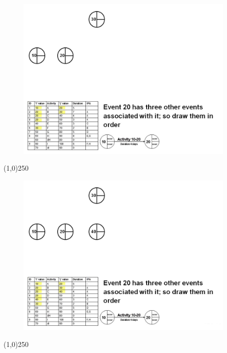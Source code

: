 \begin{frame}
\begin{figure}
	\centering
		\includegraphics[width = 10.5cm]{oldnotes/Slide83.jpg}
\end{figure}
\end{frame}
\begin{center}\line(1,0){250}\end{center}


\begin{frame}
\begin{figure}
	\centering
		\includegraphics[width = 10.5cm]{oldnotes/Slide84.jpg}
\end{figure}
\end{frame}
\begin{center}\line(1,0){250}\end{center}


